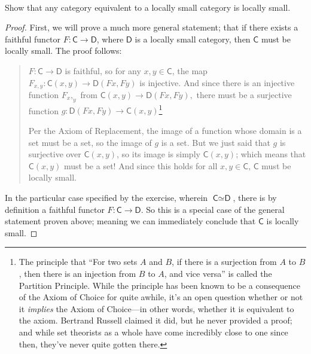 \documentclass[main.tex]{subfiles}
\begin{document}
\paragraph{}
\begin{exercise}
	Show that any category equivalent to a locally small category is locally
	small.
\end{exercise}

\begin{proof}
	First, we will prove a much more general statement; that if there exists a
	faithful functor \(F \colon \textsf{C} \to \textsf{D}\), where
	\(\textsf{D}\) is a locally small category, then \(\textsf{C}\) must be
	locally small. The proof follows:

\begin{quotation}
	\(F \colon \textsf{C} \to \textsf{D}\) is faithful, so for any \(x, y \in
	\textsf{C}\), the map \(F_{x,y} \colon \textsf{C}(x, y) \to \textsf{D}(Fx,
	Fy)\) is injective. And since there is an injective function \(F_x,_y\) from
	\(\textsf{C}(x, y) \to \textsf{D}(Fx, Fy),\) there must be a surjective
	function \(g \colon \textsf{D}(Fx, Fy) \to \textsf{C}(x,
	y)\)\footnote{The principle that ``For two sets $A$ and $B$, if there is a
		surjection from $A$ to $B$, then there is an injection from $B$ to $A$,
		and vice versa''
		is called the Partition Principle. While the principle has been known to be a
		consequence of the Axiom of Choice for quite awhile, it's an open question
		whether or not it \textit{implies} the Axiom of Choice---in other words,
		whether it is equivalent to the axiom. Bertrand Russell claimed it did, but he
		never provided a proof; and while set theorists as a whole have come incredibly
	close to one since then, they've never quite gotten there.}

	Per the Axiom of Replacement, the image of a function whose domain is a set
	must be a set, so the image of \(g\) is a set. But we just said that \(g\)
	is surjective over \(\textsf{C}(x, y)\), so its image is simply
	\(\textsf{C}(x, y)\); which means that \(\textsf{C}(x, y)\) must be a set!
	And since this holds for all \(x, y \in \textsf{C}\), \(\textsf{C}\) must be
	locally small.
\end{quotation}

In the particular case specified by the exercise, wherein \(\textsf{C} \simeq
\textsf{D}\), there is by definition a faithful functor \(F \colon \textsf{C}
\to \textsf{D}\). So this is a special case of the general statement proven
above; meaning we can immediately conclude that \(\textsf{C}\) is locally small.
\end{proof}
\end{document}
